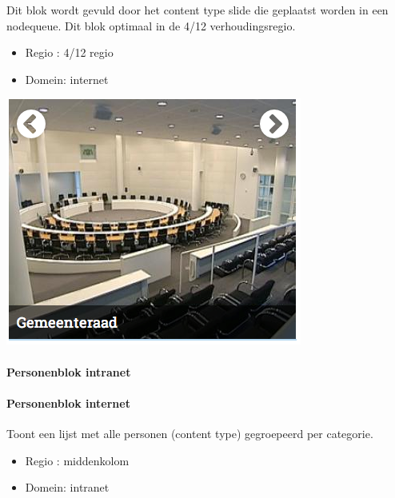 Dit blok wordt gevuld door het content type slide die geplaatst worden in een nodequeue. Dit blok optimaal in de 4/12 verhoudingsregio.

\begin{itemize}
\item Regio : 4/12 regio
\item Domein: internet
\end{itemize}

\begin{center}
	\includegraphics[scale=0.5]{img/blokken/carrouselsmal.png}
\end{center}

\paragraph{Personenblok intranet}

\paragraph{Personenblok internet}\label{personenblokinternet}

Toont een lijst met alle personen (content type) gegroepeerd per categorie.

\begin{itemize}
\item Regio : middenkolom
\item Domein: intranet
\end{itemize}

